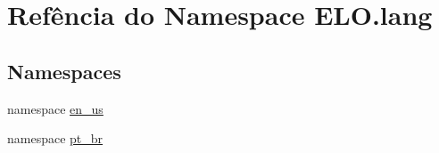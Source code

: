 \hypertarget{namespaceELO_1_1lang}{\section{Refência do Namespace E\-L\-O.\-lang}
\label{df/dbd/namespaceELO_1_1lang}
}
\subsection*{Namespaces}
\begin{DoxyCompactItemize}
\item 
namespace \hyperlink{namespaceELO_1_1lang_1_1en__us}{en\-\_\-us}
\item 
namespace \hyperlink{namespaceELO_1_1lang_1_1pt__br}{pt\-\_\-br}
\end{DoxyCompactItemize}
